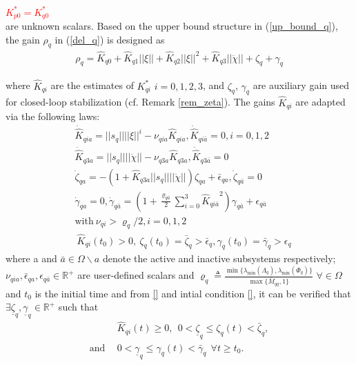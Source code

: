 \documentclass[letterpaper, 10 pt, conference]{ieeeconf}  %
\begin{document}
\textcolor{red}{$K_{p0}^* = K_{q0}^*$}\\
are unknown scalars. Based on the upper bound structure in (\ref{up_bound_q}), the gain $\rho_{q}$ in (\ref{del_q}) is designed as
\begin{align}
\rho_{q} = \hat{K}_{q0} + \hat{K}_{q1}||\xi|| + \hat{K}_{q2}||\xi||^2 + \hat{K}_{q3}||\ddot{\chi}|| + \zeta_{q} + \gamma_{q} \label{rho_q} 
\end{align}


where $\hat{K}_{qi}$ are the estimates of $K_{qi}^*$ $i=0,1,2,3$, and $\zeta_{q}$, $\gamma_{q}$ are auxiliary gain used for closed-loop stabilization (cf. Remark \ref{rem_zeta}). The gains $\hat{K}_{qi}$ are adapted via the following laws:
\begin{subequations}\label{adaptive_law_q}
\begin{align}
&\dot{\hat{K}}_{qia} = ||s_{q}||||\xi||^i - \nu_{qia} \hat{K}_{qia}, \dot{\hat{K}}_{qi\bar{a}} = 0,  i = 0,1,2
 \\
&\dot{\hat{K}}_{q3a} =  ||s_{q}||||\ddot{\chi}|| - \nu_{q3a} \hat{K}_{q3a}, \dot{\hat{K}}_{q3\bar{a}} = 0\\
&\dot{\zeta}_{qa} = -(1 + \hat{K}_{q3a}||s_{q}||||\ddot{\chi}||)\zeta_{qa} + \bar{\epsilon}_{qa}, \dot{\zeta}_{q\bar{a}} = 0    \\ \label{zeta1}
& \dot{\gamma}_{qa} = 0,  \dot{\gamma}_{q\bar{a}} = \left(1+ \frac{\varrho_{q\bar{a}}}{2}\sum \limits_{i=0}^{3} {\hat{K}_{qi\bar{a}}}^2 \right) \gamma_{q\bar{a}} +\epsilon_{q\bar{a}} \\ 
& \text{with}~ \nu_{qi} > \varrho_{q}/2, i = 0,1,2\\
&~\hat{K}_{qi} (t_0) > 0, ~\zeta_{q} (t_0)  = \bar{\zeta}_{q} > \bar{\epsilon}_{q}, \gamma_{q} (t_0) = \bar{\gamma}_{q} > \epsilon_{q}
\end{align}
\end{subequations}
where a and $\bar{a} \in \Omega \backslash {a}$ denote the active and inactive subsystems respectively; $\nu_{qia},\bar{\epsilon}_{qa}, \epsilon_{q\bar{a}}  \in\mathbb{R}^{+}$ are user-defined scalars and $\varrho_{q} \triangleq \frac{\min \lbrace \lambda_{\min}( \Lambda_{{q}} ), \lambda_{\min}( \Phi_{{q}} ) \rbrace}{\max \lbrace \bar{M}_{qq}, 1 \rbrace}$ $\forall  \in \Omega$ and $t_0$ is the initial time and from \ref{} and intial condition \ref{}, it can be verified that $\exists \underline{\zeta}_{q}, \underline{\gamma}_{q} \in \mathbb{R}^{+}$ such that
\begin{subequations}
\begin{align}
&\hat{K}_{qi}(t) \geq 0, ~~ 0 < \underline{\zeta}_{q} \leq \zeta_{q} (t) <  \bar{\zeta}_{q}, \nonumber \\
\text{and}~~ & 0 < \underline{\gamma}_{q} \leq \gamma_{q} (t) <  \bar{\gamma}_{q} ~~ \forall t \geq t_0.
\end{align}
\end{subequations}
\end{document}
